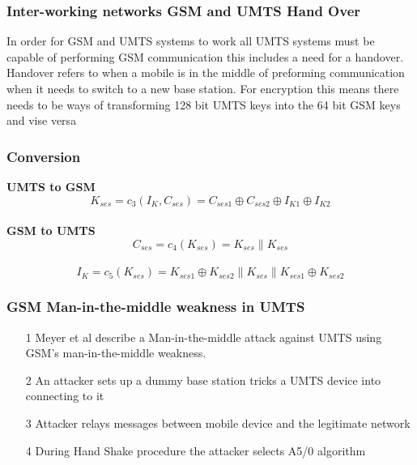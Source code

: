 \documentclass{beamer}
\begin{document}
	\begin{frame}
	
	\frametitle{Inter-working networks GSM and UMTS Hand Over}
	
	In order for GSM and UMTS systems to work all UMTS systems must be capable of performing GSM communication this includes a need for a handover. Handover refers to when a mobile is in the middle of preforming communication when it needs to switch to a new base station. For encryption this means there needs to be ways of transforming 128 bit UMTS keys into the 64 bit GSM keys and vise versa\\ 
	
	
	\end{frame}
	\begin{frame}
		\frametitle{Conversion}
		\textbf{UMTS to GSM}
		\begin{equation}
			\label{C_3}
			\mathit{K_{ses} = c_{3}(I_{K},C_{ses}) = C_{ses1} \oplus 					C_{ses2}\oplus I_{K1} \oplus I_{K2}}
		\end{equation}\\
		\textbf{GSM to UMTS}
		\begin{equation} 
			\label{C_4}
			\mathit{C_{ses} = c_{4}(K_{ses}) = K_{ses} \| K_{ses}}
		\end{equation}\\

		\begin{equation}
			\label{C_5}
			\mathit{I_{K} = c_{5}(K_{ses}) = K_{ses1}\oplus K_{ses2}\|					K_{ses}\|K_{ses1}\oplus K_{ses2}}
		\end{equation}
	
\end{frame}	
		
\begin{frame}
	\frametitle{GSM Man-in-the-middle weakness in UMTS}
	\begin{itemize}
	\item[1]Meyer et al describe a Man-in-the-middle attack against UMTS using GSM's man-in-the-middle weakness.
	\item[2]An attacker sets up a dummy base station tricks a UMTS device into connecting to it
	\item[3]Attacker relays messages between mobile device and the legitimate network
	\item[4]During Hand Shake procedure the attacker selects A5/0 algorithm
	\end{itemize}
	
	
\end{frame}
\end{document}
